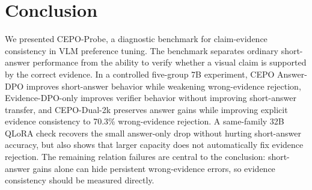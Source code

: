 \documentclass[10pt,twocolumn,letterpaper]{article}
\newcommand{\benchmark}{CEPO-Probe}
\newcommand{\answerdpo}{CEPO Answer-DPO}
\newcommand{\evidencedpo}{Evidence-DPO-only}
\newcommand{\dualtwok}{CEPO-Dual-2k}
\begin{document}
\section{Conclusion}

We presented \benchmark{}, a diagnostic benchmark for claim-evidence
consistency in VLM preference tuning. The benchmark separates ordinary
short-answer performance from the ability to verify whether a visual claim is
supported by the correct evidence. In a controlled five-group 7B experiment,
\answerdpo{} improves short-answer behavior while weakening wrong-evidence
rejection, \evidencedpo{} improves verifier behavior without improving
short-answer transfer, and \dualtwok{} preserves answer gains while improving
explicit evidence consistency to 70.3\% wrong-evidence rejection. A same-family
32B QLoRA check recovers the small answer-only drop without hurting
short-answer accuracy, but also shows that larger capacity does not
automatically fix evidence rejection. The remaining relation failures are
central to the conclusion: short-answer gains alone can hide persistent
wrong-evidence errors, so evidence consistency should be measured directly.

{
    \footnotesize
    \setlength{\bibsep}{1pt plus 0.1pt}
    
    
}

\ifdefined\cvprincludeappendix
  \clearpage
  \onecolumn
  \appendix
  
\fi
\end{document}
